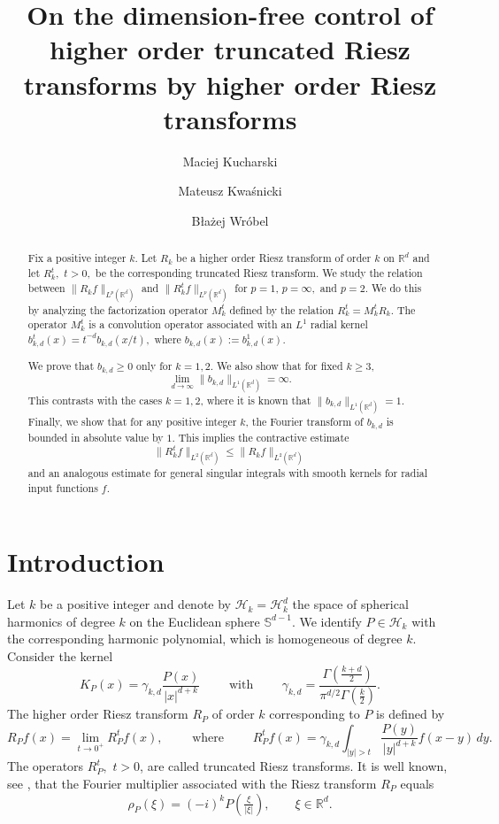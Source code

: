 \documentclass[a4paper,12pt,reqno]{amsart}
\title[Dimension-free control of truncated Riesz transforms by Riesz transforms]{On the dimension-free control of higher order truncated Riesz transforms by higher order Riesz transforms}
\author{Maciej Kucharski}
\author{Mateusz Kwaśnicki}
\author{B{\l}a{\.z}ej Wr{\'o}bel}
\numberwithin{equation}{section}
\theoremstyle{definition}
\newcommand{\R}{\mathbb{R}}
\newcommand{\mH}{\mathcal{H}}
\renewcommand{\le}{\leqslant}
\renewcommand{\ge}{\geqslant}
\begin{document}
\begin{abstract}
Fix a positive integer $k$. Let $R_k$ be a higher order Riesz transform of order $k$ on $\R^d$ and let $R_k^t,$ $t>0,$ be the corresponding truncated Riesz transform. We study the relation between  $\|R_k f\|_{L^p(\R^d)}$ and $\|R_k^t f\|_{L^p(\R^d)}$ for $p=1$, $p=\infty,$ and $p=2.$ We do this by analyzing the 
factorization operator $M_k^t$ defined by the relation $R_k^t=M_k^t R_k.$ The operator $M_k^t$ is a convolution operator associated with an $L^1$ radial kernel $b_{k,d}^t(x)=t^{-d}b_{k,d}(x/t),$ where $b_{k,d}(x):=b_{k,d}^1(x).$

We prove that  $b_{k,d} \ge 0$ only for $k=1,2.$ We also show that for fixed $k\ge 3$, 
\[
\lim_{d\to \infty}\|b_{k,d}\|_{L^1(\R^d)}=\infty.
\]
 This  contrasts with the cases $k=1,2$, where it is known that $\|b_{k,d}\|_{L^1(\R^d)}=1$. Finally, we show that for any positive integer $k$, the Fourier transform of $b_{k,d}$ is bounded in absolute value by $1.$ This implies the contractive estimate
\[
\|R_k^t f\|_{L^2(\R^d)}\le \|R_k f\|_{L^2(\R^d)}
\]
and an analogous estimate for general singular integrals with smooth kernels for radial input functions $f.$


\end{abstract}
\maketitle

\section{Introduction}

Let $k$ be a positive integer and denote by $\mH_k = \mH_k^d$ the space of spherical harmonics of degree $k$ on the Euclidean sphere $\mathbb{S}^{d-1}.$ We identify $P \in \mH_k$ with the corresponding harmonic polynomial, which is homogeneous of degree $k.$ Consider the kernel
\begin{equation}
	\label{eq:KP}
	K_P(x) = \gamma_{k,d} \frac{P(x)}{|x|^{d+k}} \qquad\textrm{ with } \qquad  \gamma_{k,d} = \frac{\Gamma(\frac{k+d}{2})}{\pi^{d/2}\Gamma(\frac{k}{2})}.
\end{equation}
The higher order Riesz transform $R_P$  of order $k$ corresponding to $P$ is defined by  
\begin{equation} \label{eq:R}
	R_P f(x)= \lim_{t \to 0^+} R_P^t f(x), \qquad\textrm{ where } \qquad R_P^t f(x) = \gamma_{k,d} \int_{|y|>t} \frac{P(y)}{|y|^{d+k}} f(x-y) \, dy.
\end{equation}
The operators $R_P^t,$ $t>0$, are called truncated Riesz transforms. It is well known, see \cite[p. 73]{stein}, that the Fourier multiplier associated with the Riesz transform $R_P$ equals 
\begin{equation} \label{eq:m}
	\rho_P(\xi) = (-i)^k P\left(\tfrac{\xi}{|\xi|}\right),\qquad \xi\in \R^d.
\end{equation}
\end{document}

